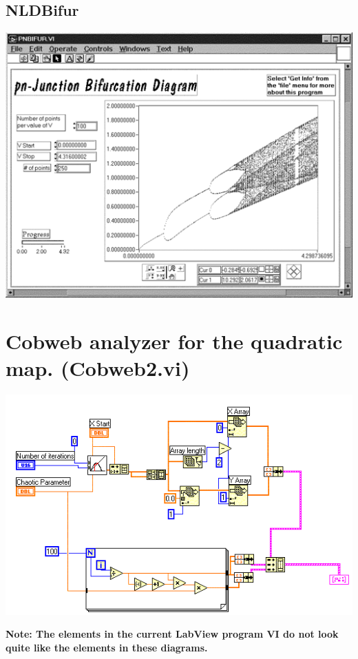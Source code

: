 \documentclass{../lab}
\begin{document}
\subsection{NLDBifur}

\begin{center}
    \href{http://experimentationlab.berkeley.edu/sites/default/files/images/Nldimage140.gif}{\includegraphics[width=0.5\linewidth]{images/Nldimage140.png}}
\end{center}

\appendix

\section{Cobweb analyzer for the quadratic map. (Cobweb2.vi)}

\begin{center}
    \href{http://experimentationlab.berkeley.edu/sites/default/files/images/Nldimage141.gif}{\includegraphics[width=\linewidth]{images/Nldimage141.png}}
\end{center}

\textbf{Note: The elements in the current LabView program VI do not look quite like the elements in these diagrams.}
\end{document}
